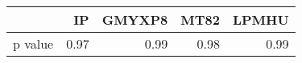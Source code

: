 \begin{tabular}{l|rrrr}

{} &    IP & GMYXP8 &  MT82 & LPMHU \\ \hline\hline

p value &  0.97 &   0.99 &  0.98 &  0.99 \\ \hline\hline

\end{tabular}
